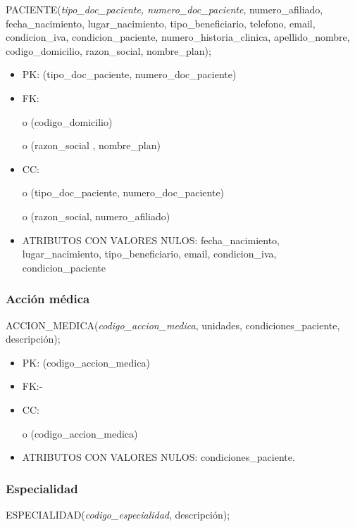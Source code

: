 \documentclass[a4paper,11pt]{article}
\begin{document}
PACIENTE(\emph{tipo\_doc\_paciente, numero\_doc\_paciente}, numero\_afiliado, fecha\_nacimiento, 
lugar\_nacimiento, tipo\_beneficiario, telefono, email, condicion\_iva, condicion\_paciente, 
numero\_historia\_clinica, apellido\_nombre, codigo\_domicilio, razon\_social, 
 nombre\_plan);

\begin{itemize}
\item PK: (tipo\_doc\_paciente, numero\_doc\_paciente)

\item FK: 

o (codigo\_domicilio) 

o (razon\_social , nombre\_plan)

\item CC:

o (tipo\_doc\_paciente, numero\_doc\_paciente)

o (razon\_social, numero\_afiliado)

\item ATRIBUTOS CON VALORES NULOS:  fecha\_nacimiento, lugar\_nacimiento, tipo\_beneficiario, 
email, condicion\_iva, condicion\_paciente\label{HToc293405836}
\end{itemize}

\subsubsection{\textbf{Acción médica}}

ACCION\_MEDICA(\emph{codigo\_accion\_medica}, unidades, condiciones\_paciente, 
descripción);

\begin{itemize}
\item PK: (codigo\_accion\_medica)

\item FK:-

\item CC:

o (codigo\_accion\_medica)

\item ATRIBUTOS CON VALORES NULOS:  condiciones\_paciente.\label{HToc293405837}
\end{itemize}

\subsubsection{\textbf{Especialidad}}

ESPECIALIDAD(\emph{codigo\_especialidad}, descripción);
\end{document}
